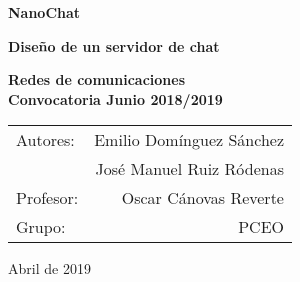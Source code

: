 \begin{titlepage}
    \begin{center}
        \vspace*{1cm}
        
        \Huge
          \textbf{NanoChat}
        
        \vspace{0.5cm}
        \LARGE
        \textbf{Diseño de un servidor de chat}
        
        \vspace{1.5cm}
        
   		  \vspace{1.5cm}
        
        \textbf{Redes de comunicaciones}\\
        \textbf{Convocatoria Junio 2018/2019}
       
        \vfill
        
        
        \vspace{0.8cm}
          \Large
          \begin{flushright}
          	\begin{tabular}{lr}
              Autores:&Emilio Domínguez Sánchez \\ &José Manuel Ruiz Ródenas \\
              Profesor:&Oscar Cánovas Reverte\\
              Grupo:& PCEO \\
            \end{tabular}
          \end{flushright}
        \vspace{0.5cm}
       Abril de 2019
        
    \end{center}
\end{titlepage}